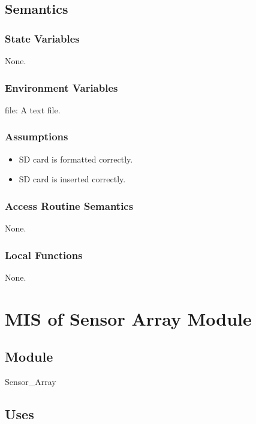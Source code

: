 \documentclass[12pt, titlepage]{article}
\begin{document}
\subsection{Semantics}

\subsubsection{State Variables}

None.

\subsubsection{Environment Variables}

file: A text file.

\subsubsection{Assumptions}
\begin{itemize}
\item SD card is formatted correctly.
\item SD card is inserted correctly.
\end{itemize}
\subsubsection{Access Routine Semantics}

None.

\subsubsection{Local Functions}

None.

\newpage



\section{MIS of Sensor Array Module} \label{mSA} 

\subsection{Module}

Sensor\_Array

\subsection{Uses}
\end{document}
